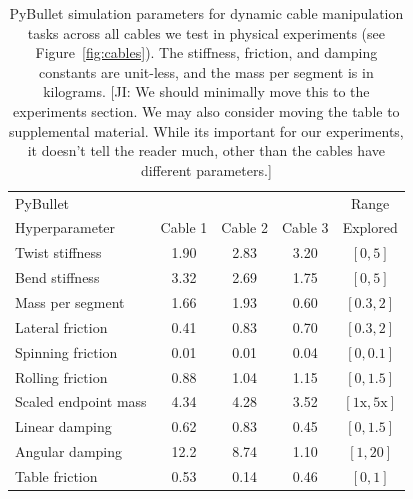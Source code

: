\documentclass[letterpaper, 10 pt, conference]{ieeeconf}  %
\newcommand{\remark}[3]{{\color{#2}[#1: #3]}}
\newcommand{\jeffi}[1]{\remark{JI}{red}{#1}}
\begin{document}
\begin{table}[t]
  \setlength\tabcolsep{3.0pt}
  \centering
  \caption{
  PyBullet simulation parameters for dynamic cable manipulation tasks across all cables we test in physical experiments (see Figure~\ref{fig:cables}). The stiffness, friction, and damping constants are unit-less, and the mass per segment is in kilograms. \jeffi{We should minimally move this to the experiments section.  We may also consider moving the table to supplemental material. While its important for our experiments, it doesn't tell the reader much, other than the cables have different parameters.}
  } 
  \small
  \begin{tabular}{@{}lcccc}
  \toprule
  PyBullet       & & & & Range \\ 
  Hyperparameter & Cable 1 & Cable 2 & Cable 3  & Explored \\
  \midrule
  Twist stiffness       & 1.90 & 2.83 & 3.20 & $[0, 5]$ \\
  Bend stiffness        & 3.32 & 2.69 & 1.75 & $[0, 5]$ \\
  Mass per segment      & 1.66 & 1.93 & 0.60 & $[0.3, 2]$ \\
  Lateral friction      & 0.41 & 0.83 & 0.70 & $[0.3, 2]$ \\
  Spinning friction     & 0.01 & 0.01 & 0.04 & $[0, 0.1]$ \\
  Rolling friction      & 0.88 & 1.04 & 1.15 & $[0, 1.5]$ \\
  Scaled endpoint mass  & 4.34 & 4.28 & 3.52 & $[1\textrm{x}, 5\textrm{x}]$ \\
  Linear damping        & 0.62 & 0.83 & 0.45 & $[0, 1.5]$ \\
  Angular damping       & 12.2 & 8.74 & 1.10 & $[1, 20]$ \\
  Table friction        & 0.53 & 0.14 & 0.46 & $[0,1]$ \\
  \bottomrule
  \end{tabular}
  \label{tab:hparams-sim}
\end{table}
\end{document}
